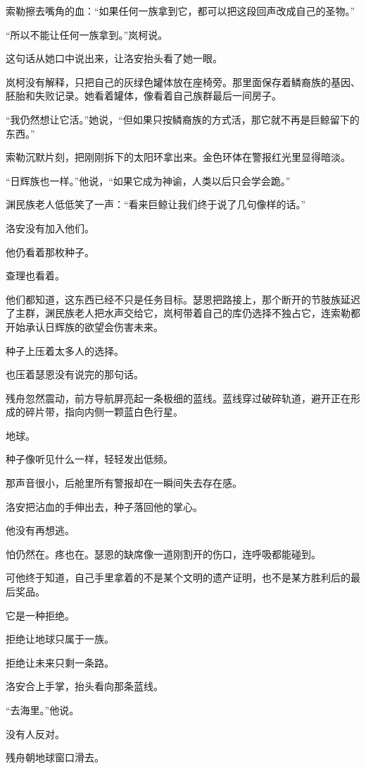 索勒擦去嘴角的血：“如果任何一族拿到它，都可以把这段回声改成自己的圣物。”

“所以不能让任何一族拿到。”岚柯说。

这句话从她口中说出来，让洛安抬头看了她一眼。

岚柯没有解释，只把自己的灰绿色罐体放在座椅旁。那里面保存着鳞裔族的基因、胚胎和失败记录。她看着罐体，像看着自己族群最后一间房子。

“我仍然想让它活。”她说，“但如果只按鳞裔族的方式活，那它就不再是巨鲸留下的东西。”

索勒沉默片刻，把刚刚拆下的太阳环拿出来。金色环体在警报红光里显得暗淡。

“日辉族也一样。”他说，“如果它成为神谕，人类以后只会学会跪。”

渊民族老人低低笑了一声：“看来巨鲸让我们终于说了几句像样的话。”

洛安没有加入他们。

他仍看着那枚种子。

查理也看着。

他们都知道，这东西已经不只是任务目标。瑟恩把路接上，那个断开的节肢族延迟了主群，渊民族老人把水声交给它，岚柯带着自己的库仍选择不独占它，连索勒都开始承认日辉族的欲望会伤害未来。

种子上压着太多人的选择。

也压着瑟恩没有说完的那句话。

残舟忽然震动，前方导航屏亮起一条极细的蓝线。蓝线穿过破碎轨道，避开正在形成的碎片带，指向内侧一颗蓝白色行星。

地球。

种子像听见什么一样，轻轻发出低频。

那声音很小，后舱里所有警报却在一瞬间失去存在感。

洛安把沾血的手伸出去，种子落回他的掌心。

他没有再想逃。

怕仍然在。疼也在。瑟恩的缺席像一道刚割开的伤口，连呼吸都能碰到。

可他终于知道，自己手里拿着的不是某个文明的遗产证明，也不是某方胜利后的最后奖品。

它是一种拒绝。

拒绝让地球只属于一族。

拒绝让未来只剩一条路。

洛安合上手掌，抬头看向那条蓝线。

“去海里。”他说。

没有人反对。

残舟朝地球窗口滑去。

